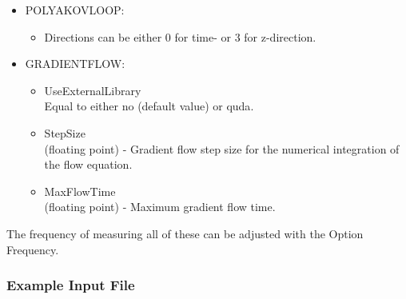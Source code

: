 \begin{itemize}
\item {\ttfamily POLYAKOVLOOP}:
  \begin{itemize}
  \item {\ttfamily Directions} can be either $0$ for time- or $3$ for z-direction.
  \end{itemize}

\item {\ttfamily GRADIENTFLOW}:
  \begin{itemize}
    \item {\ttfamily UseExternalLibrary} \\
    Equal to either {\ttfamily no} (default value) or {\ttfamily quda}.
    \item {\ttfamily StepSize} \\
    ({\ttfamily floating point}) - Gradient flow step size for the numerical integration of the flow equation.
    \item {\ttfamily MaxFlowTime} \\
    ({\ttfamily floating point}) - Maximum gradient flow time.
  \end{itemize}

\end{itemize}
The frequency of measuring all of these can be adjusted with the
Option {\ttfamily Frequency}. 


\subsubsection{Example Input File}

